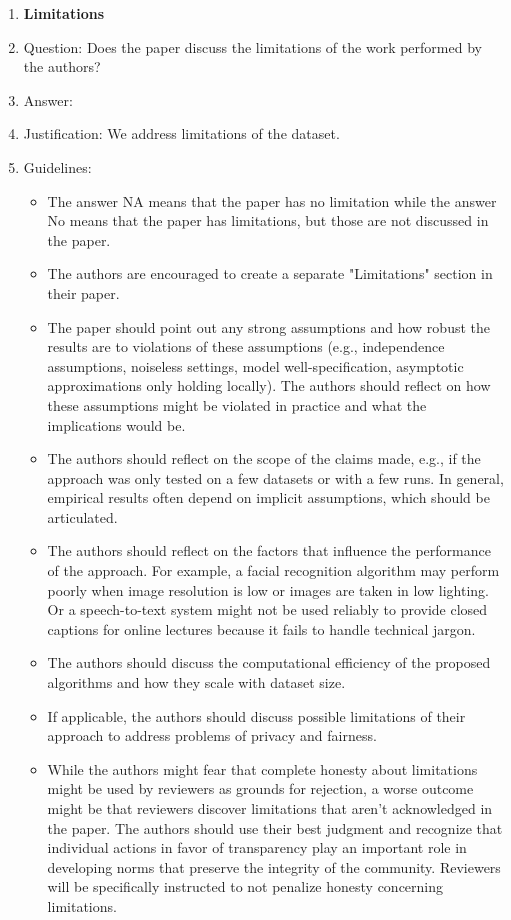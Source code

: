 \documentclass{article}
\begin{document}
\begin{enumerate}
\item {\bf Limitations}
    \item[] Question: Does the paper discuss the limitations of the work performed by the authors?
    \item[] Answer: \answerYes{} %
    \item[] Justification: We address limitations of the dataset.
    \item[] Guidelines:
    \begin{itemize}
        \item The answer NA means that the paper has no limitation while the answer No means that the paper has limitations, but those are not discussed in the paper. 
        \item The authors are encouraged to create a separate "Limitations" section in their paper.
        \item The paper should point out any strong assumptions and how robust the results are to violations of these assumptions (e.g., independence assumptions, noiseless settings, model well-specification, asymptotic approximations only holding locally). The authors should reflect on how these assumptions might be violated in practice and what the implications would be.
        \item The authors should reflect on the scope of the claims made, e.g., if the approach was only tested on a few datasets or with a few runs. In general, empirical results often depend on implicit assumptions, which should be articulated.
        \item The authors should reflect on the factors that influence the performance of the approach. For example, a facial recognition algorithm may perform poorly when image resolution is low or images are taken in low lighting. Or a speech-to-text system might not be used reliably to provide closed captions for online lectures because it fails to handle technical jargon.
        \item The authors should discuss the computational efficiency of the proposed algorithms and how they scale with dataset size.
        \item If applicable, the authors should discuss possible limitations of their approach to address problems of privacy and fairness.
        \item While the authors might fear that complete honesty about limitations might be used by reviewers as grounds for rejection, a worse outcome might be that reviewers discover limitations that aren't acknowledged in the paper. The authors should use their best judgment and recognize that individual actions in favor of transparency play an important role in developing norms that preserve the integrity of the community. Reviewers will be specifically instructed to not penalize honesty concerning limitations.
    \end{itemize}


\end{enumerate}
\end{document}
